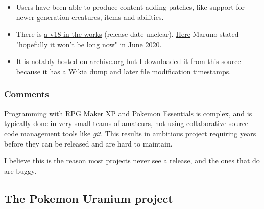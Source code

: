 \documentclass[11pt]{article}
\begin{document}
\begin{itemize}
\item Users have been able to produce content-adding patches, like support for newer generation creatures, items and abilities.

\item There is \href{https://www.reddit.com/r/PokemonRMXP/comments/ckeaov/pok\%C3\%A9mon\_essentials\_v18\_progress\_report/}{a v18 in the works} (release date unclear). \href{https://www.reddit.com/r/PokemonRMXP/comments/hb6i6m/should\_i\_wait\_for\_essentials\_v18/}{Here} Maruno stated "hopefully it won't be long now" in June 2020.

\item It is notably hosted  \href{https://archive.org/details/PokmonEssentialsV17.220171015}{on archive.org} but I downloaded it from \href{https://www.youtube.com/watch?v=-aLAoeZnRDw}{this source} because it has a Wikia dump and later file modification timestamps. %
\end{itemize}






\subsubsection{Comments}


Programming with RPG Maker XP and Pokemon Essentials is complex, and is typically done in very small teams of amateurs, not using collaborative source code management tools like \textit{git}. This results in ambitious project requiring years before they can be released and are hard to maintain.

I believe this is the reason most projects never see a release, and the ones that do are buggy.



\subsection{The Pokemon Uranium project}
\end{document}
